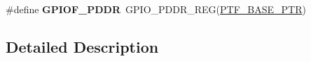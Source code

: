 \begin{DoxyCompactItemize}
\item 
\hypertarget{group___g_p_i_o___register___accessor___macros_ga15b2b0872ae00bf8f6456556ce0b6ca4}{}\#define {\bfseries G\+P\+I\+O\+F\+\_\+\+P\+D\+D\+R}~G\+P\+I\+O\+\_\+\+P\+D\+D\+R\+\_\+\+R\+E\+G(\hyperlink{group___g_p_i_o___peripheral_ga77d3c9297d0f81182ffcc68c0096eb1a}{P\+T\+F\+\_\+\+B\+A\+S\+E\+\_\+\+P\+T\+R})\label{group___g_p_i_o___register___accessor___macros_ga15b2b0872ae00bf8f6456556ce0b6ca4}

\end{DoxyCompactItemize}


\subsection{Detailed Description}
